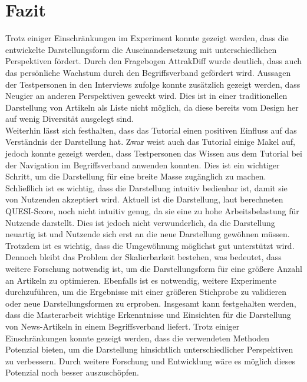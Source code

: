 \section{Fazit}\label{sec:conclusion}
Trotz einiger Einschränkungen im Experiment konnte gezeigt werden, dass die entwickelte Darstellungsform die Auseinandersetzung mit unterschiedlichen Perspektiven fördert.
Durch den Fragebogen AttrakDiff wurde deutlich, dass auch das persönliche Wachstum durch den Begriffsverband gefördert wird.
Aussagen der Testpersonen in den Interviews zufolge konnte zusätzlich gezeigt werden, dass Neugier an anderen Perspektiven geweckt wird.
Dies ist in einer traditionellen Darstellung von Artikeln als Liste nicht möglich, da diese bereits vom Design her auf wenig Diversität ausgelegt sind.\\

Weiterhin lässt sich festhalten, dass das Tutorial einen positiven Einfluss auf das Verständnis der Darstellung hat.
Zwar weist auch das Tutorial einige Makel auf, jedoch konnte gezeigt werden, dass Testpersonen das Wissen aus dem Tutorial bei der Navigation im Begriffsverband anwenden konnten.
Dies ist ein wichtiger Schritt, um die Darstellung für eine breite Masse zugänglich zu machen.
Schließlich ist es wichtig, dass die Darstellung intuitiv bedienbar ist, damit sie von Nutzenden akzeptiert wird.
Aktuell ist die Darstellung, laut berechneten \ac{QUESI}-Score, noch nicht intuitiv genug, da sie eine zu hohe Arbeitsbelastung für Nutzende darstellt.
Dies ist jedoch nicht verwunderlich, da die Darstellung neuartig ist und Nutzende sich erst an die neue Darstellung gewöhnen müssen.
Trotzdem ist es wichtig, dass die Umgewöhnung möglichst gut unterstützt wird. \\

Dennoch bleibt das Problem der Skalierbarkeit bestehen, was bedeutet, dass weitere Forschung notwendig ist, um die Darstellungsform für eine größere Anzahl an Artikeln zu optimieren.
Ebenfalls ist es notwendig, weitere Experimente durchzuführen, um die Ergebnisse mit einer größeren Stichprobe zu validieren oder neue Darstellungsformen zu erproben.
Insgesamt kann festgehalten werden, dass die Masterarbeit wichtige Erkenntnisse und Einsichten für die Darstellung von News-Artikeln in einem Begriffsverband liefert.
Trotz einiger Einschränkungen konnte gezeigt werden, dass die verwendeten Methoden Potenzial bieten, um die Darstellung hinsichtlich unterschiedlicher Perspektiven zu verbessern.
Durch weitere Forschung und Entwicklung wäre es möglich dieses Potenzial noch besser auszuschöpfen.
